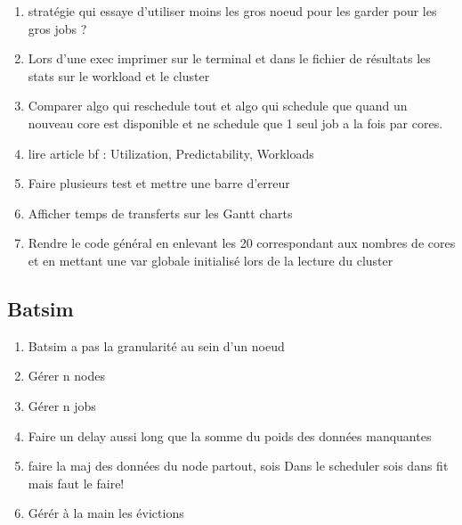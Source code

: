 \documentclass[a4paper]{article}
\begin{document}
\begin{enumerate}
			\item stratégie qui essaye d'utiliser moins les gros noeud pour les garder pour les gros jobs ?
			\item Lors d'une exec imprimer sur le terminal et dans le fichier de résultats les stats sur le workload et le cluster
			\item Comparer algo qui reschedule tout et algo qui schedule que quand un nouveau core est disponible et ne schedule que 1 seul job a la fois par cores.
			\item lire article bf : Utilization, Predictability, Workloads
			\item Faire plusieurs test et mettre une barre d'erreur
			\item Afficher temps de transferts sur les Gantt charts
			\item Rendre le code général en enlevant les 20 correspondant aux nombres de cores et en mettant une var globale initialisé lors de la lecture du cluster
		\end{enumerate}
	\subsection{Batsim}
		\begin{enumerate}
			\item Batsim a pas la granularité au sein d'un noeud
			\item Gérer n nodes
			\item Gérer n jobs
			\item Faire un delay aussi long que la somme du poids des données manquantes
			\item faire la maj des données du node partout, sois Dans le scheduler sois dans fit mais faut le faire!
			\item Gérér à la main les évictions
		\end{enumerate}
\end{document}
